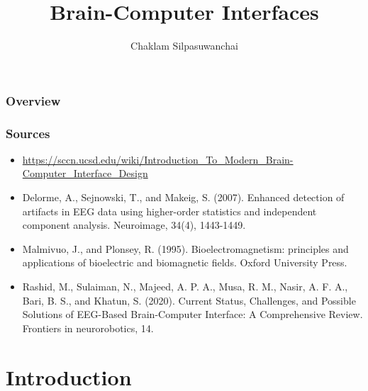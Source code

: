 \documentclass{beamer}
\title[Brain-Computer Interfaces]{Brain-Computer Interfaces} %
\author{Chaklam Silpasuwanchai} %
\institute[AIT] %
{
Asian Institute of Technology \\ %
\medskip
\textit{chaklam@ait.asia, chaklam.com} %
}
\date{} %
\begin{document}
\begin{frame}
\titlepage %
\end{frame}

\begin{frame}
\footnotesize
\frametitle{Overview} %
\begin{multicols}{2}
\tableofcontents
\end{multicols} %
\end{frame}




\begin{frame}
\frametitle{Sources} 
\begin{itemize}
	\item \url{https://sccn.ucsd.edu/wiki/Introduction_To_Modern_Brain-Computer_Interface_Design}
	\item Delorme, A., Sejnowski, T.,  and Makeig, S. (2007). Enhanced detection of artifacts in EEG data using higher-order statistics and independent component analysis. Neuroimage, 34(4), 1443-1449.	
	\item Malmivuo, J., and Plonsey, R. (1995). Bioelectromagnetism: principles and applications of bioelectric and biomagnetic fields. Oxford University Press.
	\item Rashid, M., Sulaiman, N., Majeed, A. P. A., Musa, R. M., Nasir, A. F. A., Bari, B. S., and Khatun, S. (2020). Current Status, Challenges, and Possible Solutions of EEG-Based Brain-Computer Interface: A Comprehensive Review. Frontiers in neurorobotics, 14.
\end{itemize}
\end{frame}

\section{Introduction}
\end{document}
